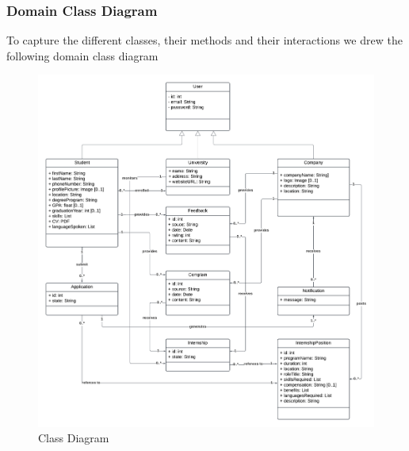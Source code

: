     \subsubsection{Domain Class Diagram}
    To capture the different classes, their methods and their interactions we drew the following domain class diagram
        \begin{figure}[h!]
            \centering
            \includegraphics[width=1\textwidth]{RASD/RASDdiagrams/2.1.2_DomainClassDiagram.png}
            \caption{Class Diagram}
            \label{fig:example}
        \end{figure}
    
    
    \newpage
